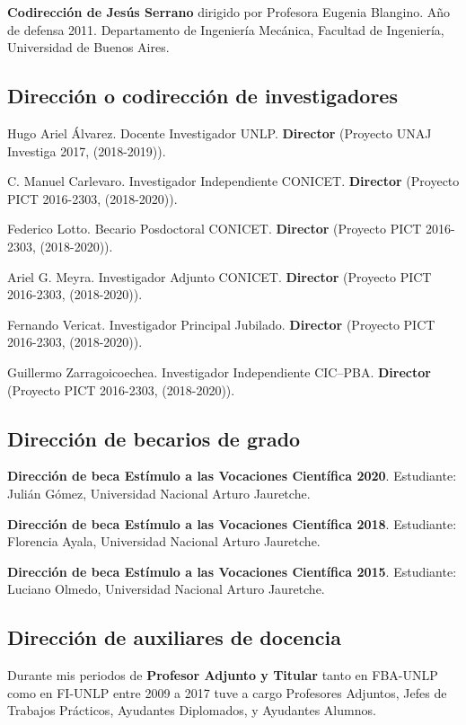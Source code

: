 \documentclass[margin,line]{res}
\begin{document}
\begin{resume}
{\bf Codirección de Jesús Serrano} dirigido por Profesora Eugenia Blangino. Año de defensa 2011. Departamento de Ingeniería Mecánica, Facultad de Ingeniería, Universidad de Buenos Aires.

\subsection{  Dirección o codirección de investigadores}
  
Hugo Ariel Álvarez. Docente Investigador UNLP. \textbf{Director} (Proyecto UNAJ Investiga 2017, (2018-2019)).
  
C. Manuel Carlevaro. Investigador Independiente CONICET. \textbf{Director} (Proyecto PICT 2016-2303, (2018-2020)).

Federico Lotto. Becario Posdoctoral CONICET. \textbf{Director} (Proyecto PICT 2016-2303, (2018-2020)).
  
Ariel G. Meyra. Investigador Adjunto CONICET. \textbf{Director} (Proyecto PICT 2016-2303, (2018-2020)).

Fernando Vericat. Investigador Principal Jubilado. \textbf{Director} (Proyecto PICT 2016-2303, (2018-2020)).

Guillermo Zarragoicoechea. Investigador Independiente CIC--PBA. \textbf{Director} (Proyecto PICT 2016-2303, (2018-2020)).

\subsection{ Dirección de becarios de grado}

{\bf Dirección de beca Estímulo a las Vocaciones Científica 2020}. Estudiante: Julián Gómez, Universidad Nacional Arturo Jauretche.

{\bf Dirección de beca Estímulo a las Vocaciones Científica 2018}. Estudiante: Florencia Ayala, Universidad Nacional Arturo Jauretche.

{\bf Dirección de beca Estímulo a las Vocaciones Científica 2015}. Estudiante: Luciano Olmedo, Universidad Nacional Arturo Jauretche.

\subsection{ Dirección de auxiliares de docencia}

Durante mis periodos de {\bf Profesor Adjunto y Titular} tanto en FBA-UNLP como en FI-UNLP entre 2009 a 2017 tuve a cargo Profesores Adjuntos, Jefes de Trabajos Prácticos, Ayudantes Diplomados, y Ayudantes Alumnos.


\end{resume}
\end{document}
